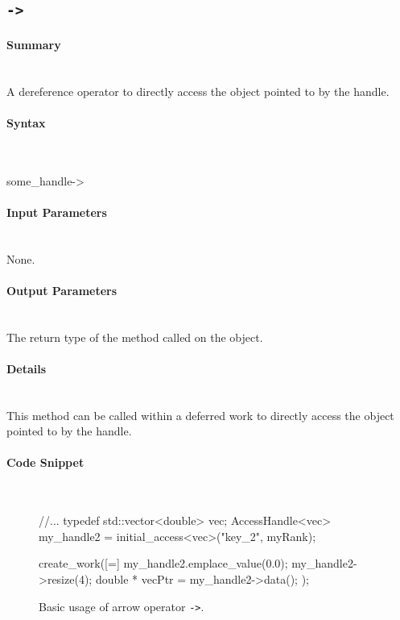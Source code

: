 \subsection{\texttt{->}}

\paragraph{Summary}\mbox{}\\
A dereference operator to directly access the object 
pointed to by the handle.


\paragraph{Syntax}\mbox{}\\
\begin{CppCode}
some_handle->
\end{CppCode}

\paragraph{Input Parameters}\mbox{}\\
None.

\paragraph{Output Parameters}\mbox{}\\
The return type of the method called on the object.

\paragraph{Details}\mbox{}\\
This method can be called within a deferred work to directly 
access the object pointed to by the handle.


\paragraph{Code Snippet}\mbox{}\\
\begin{figure}[!h]
\begin{CppCodeNumb}
//...
typedef std::vector<double> vec;
AccessHandle<vec> my_handle2 = initial_access<vec>("key_2", myRank);

create_work([=]{
	my_handle2.emplace_value(0.0);
  my_handle2->resize(4);
  double * vecPtr = my_handle2->data();    
});
\end{CppCodeNumb}
\label{fig:fe_api_arrow}
\caption{Basic usage of arrow operator \texttt{->}.}
\end{figure}

